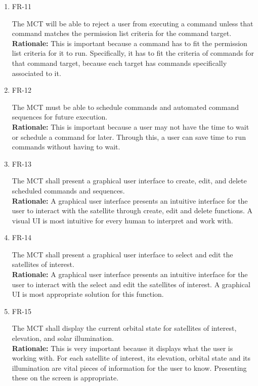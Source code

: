 \documentclass[12pt]{article}
\begin{document}
\begin{enumerate}
    \item{FR-11\\}
    
    The MCT will be able to reject a user from executing a command unless that command matches the permission list criteria for the command target. \\
    \textbf{Rationale:} This is important because a command has to fit the permission list criteria for it to run. Specifically, it has to fit the criteria of commands for that command target, because each target has commands specifically associated to it. 

    \item{FR-12\\}
    
    The MCT must be able to schedule commands and automated command sequences for future execution. \\
    \textbf{Rationale:} This is important because a user may not have the time to wait or schedule a command for later. Through this, a user can save time to run commands without having to wait. 

    \item{FR-13\\}
        
    The MCT shall present a graphical user interface to create, edit, and delete scheduled commands and sequences. \\
    \textbf{Rationale:} A graphical user interface presents an intuitive interface for the user to interact with the satellite through create, edit and delete functions. A visual UI is most intuitive for every human to interpret and work with. 

    \item{FR-14\\}

    The MCT shall present a graphical user interface to select and edit the satellites of interest. \\
    \textbf{Rationale:} A graphical user interface presents an intuitive interface for the user to interact with the select and edit the satellites of interest. A graphical UI is most appropriate solution for this function.

    \item{FR-15\\}    

    The MCT shall display the current orbital state for satellites of interest, elevation, and solar illumination. \\
    \textbf{Rationale:} This is very important because it displays what the user is working with. For each satellite of interest, its elevation, orbital state and its illumination are vital pieces of information for the user to know. Presenting these on the screen is appropriate. 
    

\end{enumerate}
\end{document}
